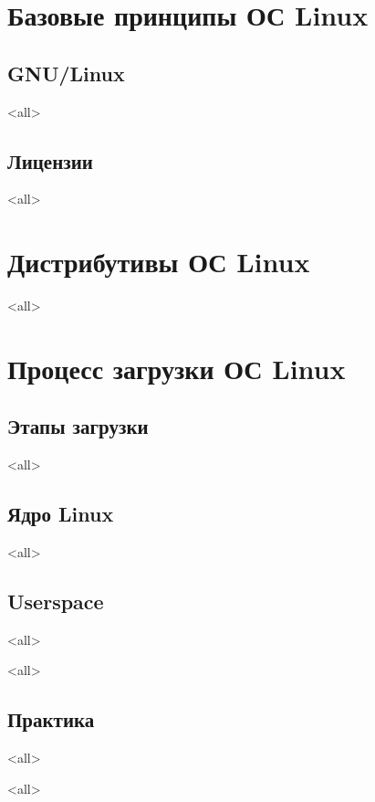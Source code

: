\section[Принципы]{Базовые принципы ОС Linux}

\subsection{GNU/Linux}

\mode<all>{}

\subsection{Лицензии}

\mode<all>{}

\section{Дистрибутивы ОС Linux}

\mode<all>{}

\section{Процесс загрузки ОС Linux}

\subsection{Этапы загрузки}

\mode<all>{}

\subsection{Ядро Linux}

\mode<all>{}

\subsection{Userspace}

\mode<all>{}

\mode<all>{}

\subsection{Практика}

\mode<all>{}


\mode<all>

